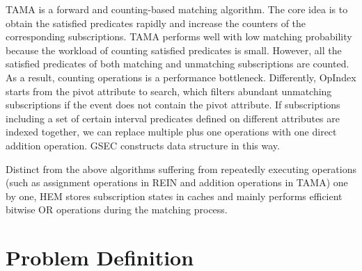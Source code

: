 \documentclass[runningheads]{llncs}
\begin{document}
TAMA \cite{TAMA} is a forward and counting-based matching algorithm. The core idea is to obtain the satisfied predicates rapidly and increase the counters of the corresponding subscriptions.
TAMA performs well with low matching probability because the workload of counting satisfied predicates is small. However, all the satisfied predicates of both matching and unmatching subscriptions are counted. As a result, counting operations is a performance bottleneck. 
Differently, OpIndex \cite{OpIndex} starts from the pivot attribute to search, which filters abundant unmatching subscriptions if the event does not contain the pivot attribute. 
If subscriptions including a set of certain interval predicates defined on different attributes are indexed together, we can replace multiple plus one operations with one direct addition operation. GSEC \cite{GSEC} constructs data structure in this way.

Distinct from the above algorithms suffering from repeatedly executing operations (such as assignment operations in REIN and addition operations in TAMA) one by one,  
HEM stores subscription states in caches and mainly performs efficient bitwise OR operations during the matching process. %


\section{Problem Definition}
\end{document}
